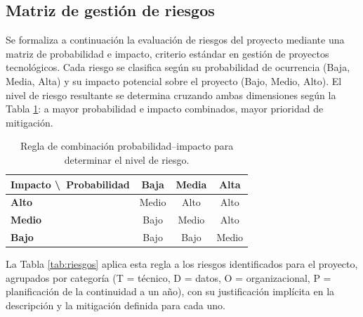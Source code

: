 \documentclass[11pt,a4paper]{article}
\begin{document}
\subsection{Matriz de gestión de riesgos}
Se formaliza a continuación la evaluación de riesgos del proyecto mediante una matriz de probabilidad e impacto, criterio estándar en gestión de proyectos tecnológicos. Cada riesgo se clasifica según su probabilidad de ocurrencia (Baja, Media, Alta) y su impacto potencial sobre el proyecto (Bajo, Medio, Alto). El nivel de riesgo resultante se determina cruzando ambas dimensiones según la Tabla \ref{tab:matriz-regla}: a mayor probabilidad e impacto combinados, mayor prioridad de mitigación.

\begin{table}[H]
\centering
\caption{Regla de combinación probabilidad--impacto para determinar el nivel de riesgo.}
\label{tab:matriz-regla}
\small
\begin{tabular}{l c c c}
\toprule
\textbf{Impacto \textbackslash\ Probabilidad} & \textbf{Baja} & \textbf{Media} & \textbf{Alta} \\
\midrule
\textbf{Alto} & \cellcolor{yellow!35}Medio & \cellcolor{red!25}Alto & \cellcolor{red!25}Alto \\
\textbf{Medio} & \cellcolor{green!25}Bajo & \cellcolor{yellow!35}Medio & \cellcolor{red!25}Alto \\
\textbf{Bajo} & \cellcolor{green!25}Bajo & \cellcolor{green!25}Bajo & \cellcolor{yellow!35}Medio \\
\bottomrule
\end{tabular}
\end{table}

La Tabla \ref{tab:riesgos} aplica esta regla a los riesgos identificados para el proyecto, agrupados por categoría (T = técnico, D = datos, O = organizacional, P = planificación de la continuidad a un año), con su justificación implícita en la descripción y la mitigación definida para cada uno.
\end{document}
